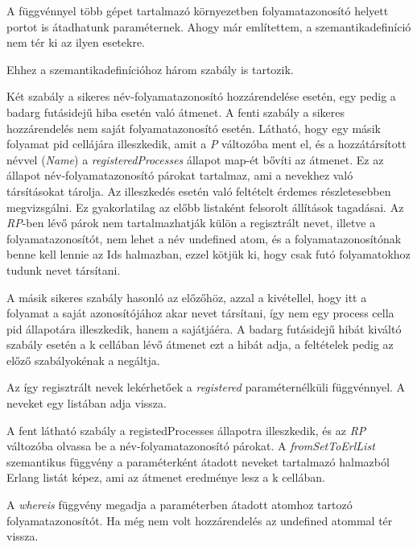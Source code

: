 A függvénnyel több gépet tartalmazó környezetben folyamatazonosító helyett portot is átadhatunk paraméternek. Ahogy már említettem, a szemantikadefiníció nem tér ki az ilyen esetekre.

Ehhez a szemantikadefinícióhoz három szabály is tartozik.



Két szabály a sikeres név-folyamatazonosító hozzárendelése esetén, egy pedig a badarg futásidejű hiba esetén való átmenet. A fenti szabály a sikeres hozzárendelés nem saját folyamatazonosító esetén. Látható, hogy egy másik folyamat pid cellájára illeszkedik, amit a \textit{P} változóba ment el, és a hozzátársított névvel (\textit{Name}) a \textit{registeredProcesses} állapot map-ét bővíti az átmenet. Ez az állapot név-folyamatazonosító párokat tartalmaz, ami a nevekhez való társításokat tárolja. Az illeszkedés esetén való feltételt érdemes részletesebben megvizsgálni. Ez gyakorlatilag az előbb listaként felsorolt állítások tagadásai. Az \textit{RP}-ben lévő párok nem tartalmazhatják külön a regisztrált nevet, illetve a folyamatazonosítót, nem lehet a név undefined atom, és a folyamatazonosítónak benne kell lennie az Ids halmazban, ezzel kötjük ki, hogy csak futó folyamatokhoz tudunk nevet társítani.

A másik sikeres szabály hasonló az előzőhöz, azzal a kivétellel, hogy itt a folyamat a saját azonosítójához akar nevet társítani, így nem egy process cella pid állapotára illeszkedik, hanem a sajátjáéra. A badarg futásidejű hibát kiváltó szabály esetén a k cellában lévő átmenet ezt a hibát adja, a feltételek pedig az előző szabályokénak a negáltja.

Az így regisztrált nevek lekérhetőek a \textit{registered} paraméternélküli függvénnyel. A neveket egy listában adja vissza.



A fent látható szabály a registedProcesses állapotra illeszkedik, és az \textit{RP} változóba olvassa be a név-folyamatazonosító párokat. A \textit{fromSetToErlList} szemantikus függvény a paraméterként átadott neveket tartalmazó halmazból Erlang listát képez, ami az átmenet eredménye lesz a k cellában.

A \textit{whereis} függvény megadja a paraméterben átadott atomhoz tartozó folyamatazonosítót. Ha még nem volt hozzárendelés az undefined atommal tér vissza.



